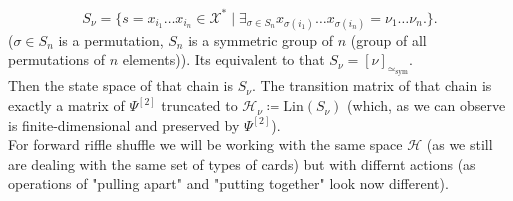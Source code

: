 \documentclass[a4paper, 12pt]{report}
\newcommand{\SimeqSym}{{\simeq_\mathrm{sym}}}
\begin{document}
\begin{equation*}
S_\nu = \{ s = x_{i_1}\dots x_{i_n} \in \mathcal{X}^* \mid
\exists_{\sigma \in S_n} x_{\sigma(i_1)}\dots x_{\sigma(i_n)} = \nu_1\dots \nu_n. \}.
\end{equation*}
($\sigma \in S_n$ is a permutation, $S_n$ is a symmetric group of $n$ (group of
all permutations of $n$ elements)). Its equivalent to that $S_\nu = [\nu]_\SimeqSym$.\\
Then the state space of that chain is $S_\nu$. The transition matrix of that chain is exactly a matrix of
$\Psi^{[2]}$ truncated to $\mathcal{H}_\nu \coloneqq \mathrm{Lin}(S_\nu)$
(which, as we can observe is finite-dimensional and preserved by $\Psi^{[2]}$). \\[8pt]
For forward riffle shuffle we will be working with the same space $\mathcal{H}$ (as we still
are dealing with the same set of types of cards) but with differnt actions (as operations of "pulling apart"
and "putting together" look now different). \\
\end{document}
